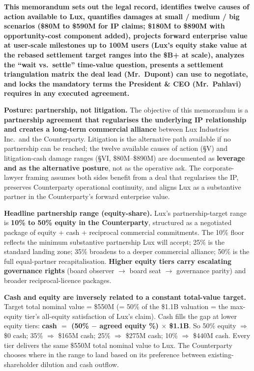 \documentclass[11pt,letterpaper]{article}
\begin{document}
\textbf{This memorandum sets out the legal record, identifies twelve
causes of action available to Lux, quantifies damages at small /
medium / big scenarios (\$80M to \$590M for IP claims; \$180M to
\$890M with opportunity-cost component added), projects forward
enterprise value at user-scale milestones up to 100M users (Lux's
equity stake value at the rebased settlement target ranges into the
\$B+ at scale), analyzes the ``wait vs.\ settle'' time-value question,
presents a settlement triangulation matrix the deal lead (Mr.\ Dupont)
can use to negotiate, and locks the mandatory terms the President \&
CEO (Mr.\ Pahlavi) requires in any executed agreement.}

\textbf{Posture: partnership, not litigation.} The objective of this
memorandum is a \textbf{partnership agreement that regularises the
underlying IP relationship and creates a long-term commercial
alliance} between Lux Industries Inc.\ and the Counterparty.
Litigation is the alternative path available if no partnership can
be reached; the twelve available causes of action (\S V) and
litigation-cash damage ranges (\S VI, \$80M--\$890M) are documented
as \textbf{leverage and as the alternative posture}, not as the
operative ask. The corporate-lawyer framing assumes both sides
benefit from a deal that regularises the IP, preserves Counterparty
operational continuity, and aligns Lux as a substantive partner in
the Counterparty's forward enterprise value.

\textbf{Headline partnership range (equity-share).} Lux's
partnership-target range is \textbf{10\% to 50\% equity in the
Counterparty}, structured as a negotiated package of equity + cash
+ reciprocal commercial commitments. The 10\% floor reflects the
minimum substantive partnership Lux will accept; 25\% is the standard
landing zone; 35\% broadens to a deeper commercial alliance; 50\% is
the full equal-partner recapitalisation. \textbf{Higher equity tiers
carry escalating governance rights} (board observer $\to$ board seat
$\to$ governance parity) and broader reciprocal-licence packages.

\textbf{Cash and equity are inversely related to a constant
total-value target.} Target total nominal value = \$550M (= 50\% of
the \$1.1B valuation = the max-equity tier's all-equity satisfaction
of Lux's claim). Cash fills the gap at lower equity tiers:
\textbf{cash $=$ (50\% $-$ agreed equity \%) $\times$ \$1.1B}. So
50\% equity $\Rightarrow$ \$0 cash; 35\% $\Rightarrow$ \$165M cash;
25\% $\Rightarrow$ \$275M cash; 10\% $\Rightarrow$ \$440M cash. Every
tier delivers the same \$550M total nominal value to Lux. The
Counterparty chooses where in the range to land based on its
preference between existing-shareholder dilution and cash outflow.
\end{document}
